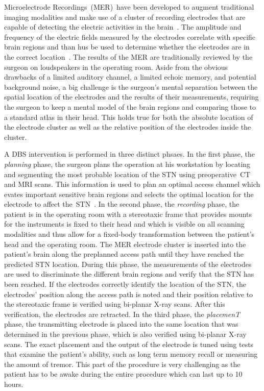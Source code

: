 Microelectrode Recordings~(MER)~have been developed to augment traditional imaging modalities and make use of a cluster of recording electrodes that are capable of detecting the electric activities in the brain~\cite{lenz1988methods}.  The amplitude and frequency of the electric fields measured by the electrodes correlate with specific brain regions and than hus be used to determine whether the electrodes are in the correct location~\cite{benazzouz2002intraoperative}.  The results of the MER are traditionally reviewed by the surgeon on loudspeakers in the operating room.  Aside from the obvious drawbacks of a limited auditory channel, a limited echoic memory, and potential background noise, a big challenge is the surgeon's mental separation between the spatial location of the electrodes and the results of their measurements, requiring the surgeon to keep a mental model of the brain regions and comparing those to a standard atlas in their head.  This holds true for both the absolute location of the electrode cluster as well as the relative position of the electrodes inside the cluster.

A DBS intervention is performed in three distinct phsaes.  In the first phase, the \emph{planning} phase, the surgeon plans the operation at his workstation by locating and segmenting the most probable location of the STN using preoperative~CT and MRI scans.  This information is used to plan an optimal access channel which evates important sensitive brain regions and selects the optimal location for the electrode to affect the~STN~\cite{butson2007patient}.  In the second phase, the \emph{recording} phase, the patient is in the operating room with a stereotaxic frame that provides mounts for the instruments is fixed to their head and which is visible on all scanning modalities and thus allow for a fixed-body transformation between the patient's head and the operating room.  The MER electrode cluster is inserted into the patient's  brain along the preplanned access path until they have reached the predicted STN location.  During this phase, the measurements of the electrodes are used to discriminate the different brain regions and verify that the STN has been reached.  If the electrodes correctly identify the location of the STN, the electrodes' position along the access path is noted and their position relative to the stereotaxic frame is verified using bi-planar X-ray scans.  After this verification, the electrodes are retracted.  In the third phase, the \emph{placemenT} phase, the transmitting electrode is placed into the same location that was determined in the previous phase, which is also verified using bi-planar X-ray scans.  The exact placement and the output of the electrode is tuned using tests that examine the patient's ability, such as long term memory recall or measuring the amount of tremor.  This part of the procedure is very challenging as the patient has to be awake during the entire procedure which can last up to 10 hours.



